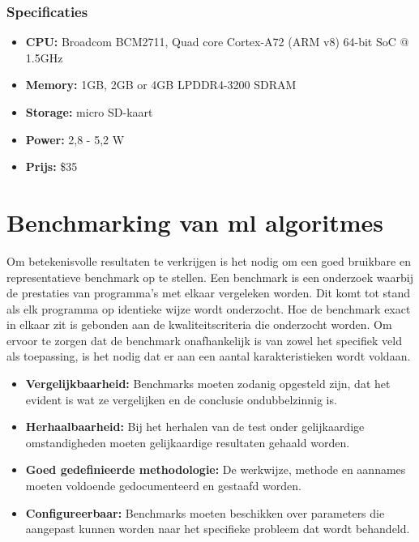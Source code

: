 		\subsubsection{Specificaties}
		\begin{itemize}
			\item \textbf{CPU:} Broadcom BCM2711, Quad core Cortex-A72 (ARM v8) 64-bit SoC @ 1.5GHz
			\item \textbf{Memory:} 1GB, 2GB or 4GB LPDDR4-3200 SDRAM
			\item \textbf{Storage:}  micro SD-kaart
			\item \textbf{Power:} 2,8 - 5,2 W
			\item \textbf{Prijs:} \$35
		\end{itemize}	
	
\newpage

\section{Benchmarking van \gls{ml} algoritmes}
\label{benchmark}

Om betekenisvolle resultaten te verkrijgen is het nodig om een goed bruikbare en representatieve benchmark op te stellen. Een benchmark is een onderzoek waarbij de prestaties van programma's met elkaar vergeleken worden. Dit komt tot stand als elk programma op identieke wijze wordt onderzocht. Hoe de benchmark exact in elkaar zit is gebonden aan de kwaliteitscriteria die onderzocht worden. Om ervoor te zorgen dat de benchmark onafhankelijk is van zowel het specifiek veld als toepassing, is het nodig dat er aan een aantal karakteristieken wordt voldaan\cite{libuttibenchmarking}.

\begin{itemize}
	\item \textbf{Vergelijkbaarheid:} Benchmarks moeten zodanig opgesteld zijn, dat het evident is wat ze vergelijken en de conclusie ondubbelzinnig is.
	\item \textbf{Herhaalbaarheid:} Bij het herhalen van de test onder gelijkaardige omstandigheden moeten gelijkaardige resultaten gehaald worden.
	\item \textbf{Goed gedefinieerde methodologie:} De werkwijze, methode en aannames moeten voldoende gedocumenteerd en gestaafd worden.
	\item \textbf{Configureerbaar:} Benchmarks moeten beschikken over parameters die aangepast kunnen worden naar het specifieke probleem dat wordt behandeld.
\end{itemize}


